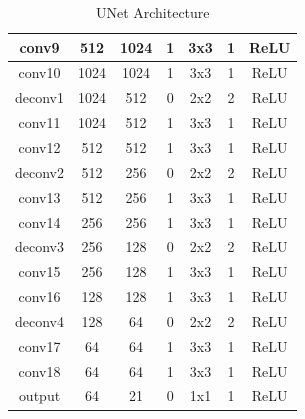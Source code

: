 \begin{table}[htbp]
\begin{tabular}{|c|c|c|c|c|c|c|}
		conv9          & 512         & 1024         & 1                & 3x3             & 1               & ReLU                \\ \hline
		conv10         & 1024        & 1024         & 1                & 3x3             & 1               & ReLU                \\ \hline
		deconv1        & 1024        & 512          & 0                & 2x2             & 2               & ReLU                \\ \hline
		conv11         & 1024        & 512          & 1                & 3x3             & 1               & ReLU                \\ \hline
		conv12         & 512         & 512          & 1                & 3x3             & 1               & ReLU                \\ \hline
		deconv2        & 512         & 256          & 0                & 2x2             & 2               & ReLU                \\ \hline
		conv13         & 512         & 256          & 1                & 3x3             & 1               & ReLU                \\ \hline
		conv14         & 256         & 256          & 1                & 3x3             & 1               & ReLU                \\ \hline
		deconv3        & 256         & 128          & 0                & 2x2             & 2               & ReLU                \\ \hline
		conv15         & 256         & 128          & 1                & 3x3             & 1               & ReLU                \\ \hline
		conv16         & 128         & 128          & 1                & 3x3             & 1               & ReLU                \\ \hline
		deconv4        & 128         & 64           & 0                & 2x2             & 2               & ReLU                \\ \hline
		conv17         & 64          & 64           & 1                & 3x3             & 1               & ReLU                \\ \hline
		conv18         & 64          & 64           & 1                & 3x3             & 1               & ReLU                \\ \hline
		output         & 64          & 21           & 0                & 1x1             & 1               & ReLU                \\ \hline
	\end{tabular}
	\caption{UNet Architecture}
\end{table}

